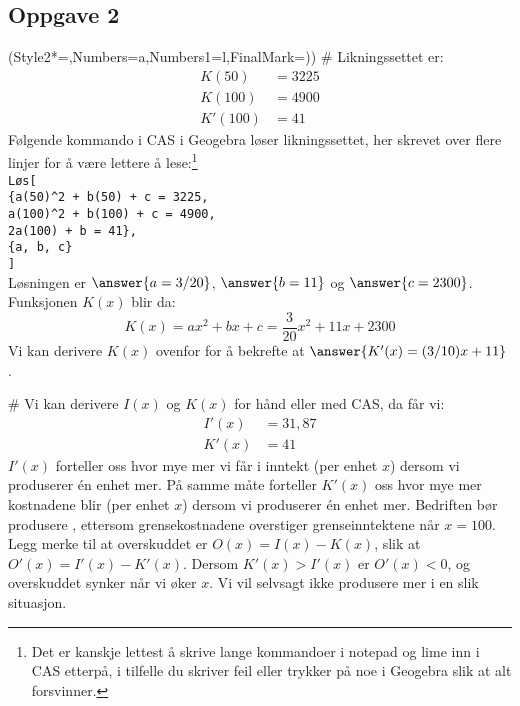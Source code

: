 \subsection*{Oppgave 2}
\begin{easylist}[enumerate]
	\ListProperties(Style2*=,Numbers=a,Numbers1=l,FinalMark={)})
	# Likningssettet er:
	\begin{align*}
		K(50) &= 3225 \\
		K(100) &= 4900 \\
		K'(100) &= 41 
	\end{align*}
	Følgende kommando i CAS i Geogebra løser likningssettet, her skrevet over flere linjer for å være lettere å lese:\footnote{Det er kanskje lettest å skrive lange kommandoer i notepad og lime inn i CAS etterpå, i tilfelle du skriver feil eller trykker på noe i Geogebra slik at alt forsvinner.} \\
	\texttt{Løs[\\
		\{a(50)\textasciicircum2 + b(50) + c = 3225, \\ 
		a(100)\textasciicircum2 + b(100) + c = 4900, \\ 
		2a(100) + b = 41\}, \\
		\{a, b, c\}\\
		]} \\
	Løsningen er $\answer{a = 3/20}$, $\answer{b = 11}$ og $\answer{c = 2300}$. Funksjonen $K(x)$ blir da:
	\begin{equation*}
	K(x) = ax^2 + bx + c = \frac{3}{20}x^2 + 11x + 2300
	\end{equation*}
	Vi kan derivere $K(x)$ ovenfor for å bekrefte at $\answer{K'(x) = (3/10)x + 11}$.
	
	# Vi kan derivere $I(x)$ og $K(x)$ for hånd eller med CAS, da får vi:
	\begin{align*}
		I'(x) & = 31,87 \\
		K'(x) & = 41
	\end{align*}
	$I'(x)$ forteller oss hvor mye mer vi får i inntekt (per enhet $x$) dersom vi produserer én enhet mer. På samme måte forteller $K'(x)$ oss hvor mye mer kostnadene blir (per enhet $x$) dersom vi produserer én enhet mer.
	Bedriften bør produsere , ettersom grensekostnadene overstiger grenseinntektene når $x = 100$.
	Legg merke til at overskuddet er $O(x) = I(x) - K(x)$, slik at $O'(x) = I'(x) - K'(x)$.
	Dersom $K'(x) > I'(x)$ er $O'(x) < 0$, og overskuddet synker når vi øker $x$. Vi vil selvsagt ikke produsere mer i en slik situasjon.
	

\end{easylist}
